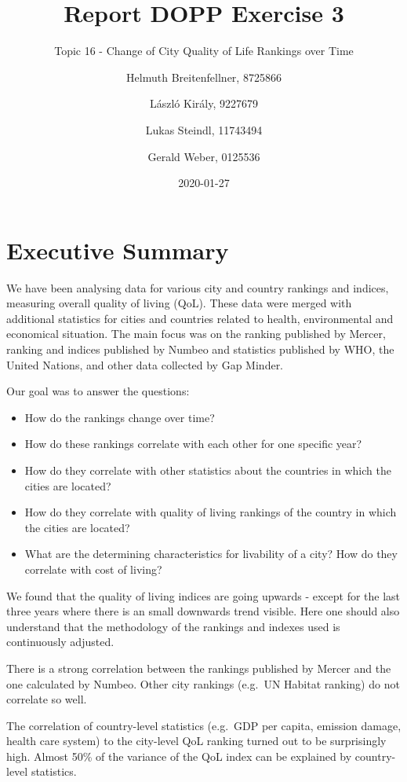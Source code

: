 \documentclass[
  twocolumn]{article}
\title{Report DOPP Exercise 3}
\subtitle{Topic 16 - Change of City Quality of Life Rankings over Time}
\author{Helmuth Breitenfellner, 8725866 \and László Király, 9227679 \and Lukas Steindl, 11743494 \and Gerald Weber, 0125536}
\date{2020-01-27}
\providecommand{\tightlist}{%
  \setlength{\itemsep}{0pt}\setlength{\parskip}{0pt}}
\begin{document}
\maketitle

\hypertarget{executive-summary}{%
\section{Executive Summary}\label{executive-summary}}

We have been analysing data for various city and country rankings and
indices, measuring overall quality of living (QoL). These data were
merged with additional statistics for cities and countries related to
health, environmental and economical situation. The main focus was on
the ranking published by Mercer, ranking and indices published by Numbeo
and statistics published by WHO, the United Nations, and other data
collected by Gap Minder.

Our goal was to answer the questions:

\begin{itemize}
\tightlist
\item
  How do the rankings change over time?
\item
  How do these rankings correlate with each other for one specific year?
\item
  How do they correlate with other statistics about the countries in
  which the cities are located?
\item
  How do they correlate with quality of living rankings of the country
  in which the cities are located?
\item
  What are the determining characteristics for livability of a city? How
  do they correlate with cost of living?
\end{itemize}

We found that the quality of living indices are going upwards - except
for the last three years where there is an small downwards trend
visible. Here one should also understand that the methodology of the
rankings and indexes used is continuously adjusted.

There is a strong correlation between the rankings published by Mercer
and the one calculated by Numbeo. Other city rankings (e.g.~UN Habitat
ranking) do not correlate so well.

The correlation of country-level statistics (e.g.~GDP per capita,
emission damage, health care system) to the city-level QoL ranking
turned out to be surprisingly high. Almost 50\% of the variance of the
QoL index can be explained by country-level statistics.
\end{document}

